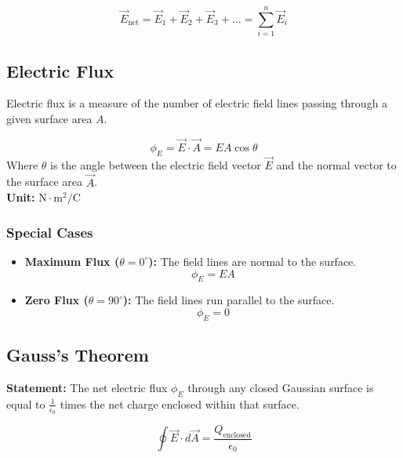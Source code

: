 \documentclass[11pt,a4paper]{article}
\begin{document}
\begin{formulabox}
    \[ \vec{E}_{\text{net}} = \vec{E}_1 + \vec{E}_2 + \vec{E}_3 + \dots = \sum_{i=1}^n \vec{E}_i \]
\end{formulabox}

\subsection{Electric Flux}
Electric flux is a measure of the number of electric field lines passing through a given surface area $A$.

\begin{formulabox}
    \[ \phi_E = \vec{E} \cdot \vec{A} = EA \cos\theta \]
    Where $\theta$ is the angle between the electric field vector $\vec{E}$ and the normal vector to the surface area $\vec{A}$. \\[0.2cm]
    \textbf{Unit:} $\text{N}\cdot\text{m}^2/\text{C}$
\end{formulabox}

\subsubsection{Special Cases}
\begin{itemize}
    \item \textbf{Maximum Flux ($\theta = 0^\circ$):} The field lines are normal to the surface.
    \[ \phi_E = EA \]
    \item \textbf{Zero Flux ($\theta = 90^\circ$):} The field lines run parallel to the surface.
    \[ \phi_E = 0 \]
\end{itemize}

\subsection{Gauss's Theorem}
\begin{pyqbox}
    \textbf{Statement:} The net electric flux $\phi_E$ through any closed Gaussian surface is equal to $\frac{1}{\epsilon_0}$ times the net charge enclosed within that surface.
\end{pyqbox}

\begin{formulabox}
    \[ \oint \vec{E} \cdot d\vec{A} = \frac{Q_{\text{enclosed}}}{\epsilon_0} \]
\end{formulabox}
\end{document}
